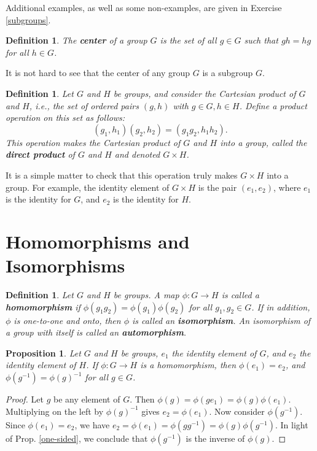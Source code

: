 \documentclass[12pt]{amsbook}
\theoremstyle{plain}
\newtheorem{definition}[theorem]{Definition}
\newtheorem{proposition}[theorem]{Proposition}
\numberwithin{equation}{chapter}
\numberwithin{theorem}{chapter}
\begin{document}
Additional examples, as well as some non-examples, are given in Exercise
\ref{subgroups}.

\begin{definition}
The \textbf{center} of a group $G$ is the set of all $g\in G$ such that
$gh=hg$ for all $h\in G$.
\end{definition}

It is not hard to see that the center of any group $G$ is a subgroup $G$.

\begin{definition}
Let $G$ and $H$ be groups, and consider the Cartesian product of $G$ and $H$,
i.e., the set of ordered pairs $(g,h)$ with $g\in G,h\in H$. Define a product
operation on this set as follows:
\[
(g_{1},h_{1})(g_{2},h_{2})=(g_{1}g_{2},h_{1}h_{2})\text{.}%
\]
This operation makes the Cartesian product of $G$ and $H$ into a group, called
the \textbf{direct product} of $G$ and $H$ and denoted $G\times H$.
\end{definition}

It is a simple matter to check that this operation truly makes $G\times H$
into a group. For example, the identity element of $G\times H$ is the pair
$(e_{1},e_{2})$, where $e_{1}$ is the identity for $G$, and $e_{2}$ is the
identity for $H$.

\section{Homomorphisms and Isomorphisms}

\begin{definition}
Let $G$ and $H$ be groups. A map $\phi:G\rightarrow H$ is called a
\textbf{homomorphism} if $\phi(g_{1}g_{2})=\phi(g_{1})\phi(g_{2})$ for all
$g_{1},g_{2}\in G$. If in addition, $\phi$ is one-to-one and onto, then $\phi$
is called an \textbf{isomorphism}. An isomorphism of a group with itself is
called an \textbf{automorphism}.
\end{definition}

\begin{proposition}
Let $G$ and $H$ be groups, $e_{1}$ the identity element of $G$, and $e_{2}$
the identity element of $H$. If $\phi:G\rightarrow H$ is a homomorphism, then
$\phi(e_{1})=e_{2}$, and $\phi(g^{-1})=\phi(g)^{-1}$ for all $g\in G$.
\end{proposition}

\begin{proof}
Let $g$ be any element of $G$. Then $\phi(g)=\phi(ge_{1})=\phi(g)\phi(e_{1})$.
Multiplying on the left by $\phi(g)^{-1}$ gives $e_{2}=\phi(e_{1})$. Now
consider $\phi(g^{-1})$. Since $\phi(e_{1})=e_{2}$, we have $e_{2}=\phi
(e_{1})=\phi(gg^{-1})=\phi(g)\phi(g^{-1})$. In light of Prop. \ref{one-sided},
we conclude that $\phi(g^{-1})$ is the inverse of $\phi(g)$.
\end{proof}
\end{document}
